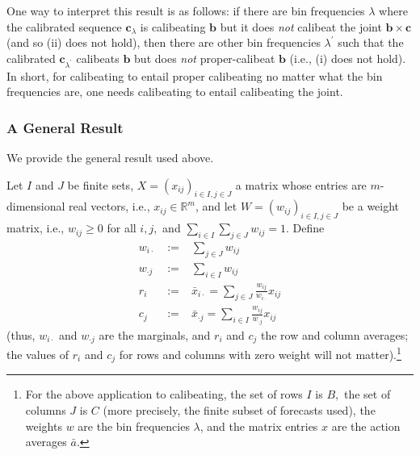 \documentclass[12pt,a4paper,notitlepage]{article}
\begin{document}
\bigskip

One way to interpret this result is as follows: if there are bin frequencies 
$\lambda $ where the calibrated sequence $\mathbf{c}_{\lambda }$ is
calibeating $\mathbf{b}$ but it does \emph{not} calibeat the joint $\mathbf{b%
}\times \mathbf{c}$ (and so (ii) does not hold), then there are other bin
frequencies $\lambda ^{\prime }$ such that the calibrated $\mathbf{c}%
_{\lambda ^{\prime }}$ calibeats $\mathbf{b}$ but does \emph{not}
proper-calibeat $\mathbf{b}$ (i.e., (i) does not hold). In short, for
calibeating to entail proper calibeating no matter what the bin frequencies
are, one needs calibeating to entail calibeating the joint.

\subsubsection{A General Result\label{susus-a:bxc general}}

We provide the general result used above.

Let $I$ and $J$ be finite sets, $X=(x_{ij})_{i\in I,j\in J}$ a matrix whose
entries are $m$-dimensional real vectors, i.e., $x_{ij}\in \mathbb{R}^{m}$,
and let $W=(w_{ij})_{i\in I,j\in J}$ be a weight matrix, i.e., $w_{ij}\geq 0$
for all $i,j,$ and $\sum_{i\in I}\sum_{j\in J}w_{ij}=1$. Define%
\begin{eqnarray*}
w_{i\cdot } &%
{\;:=\;}%
&\sum_{j\in J}w_{ij} \\
w_{\cdot j} &%
{\;:=\;}%
&\sum_{i\in I}w_{ij} \\
r_{i} &%
{\;:=\;}%
&\bar{x}_{i\cdot }=\sum_{j\in J}\frac{w_{ij}}{w_{i\cdot }}x_{ij} \\
c_{j} &%
{\;:=\;}%
&\bar{x}_{\cdot j}=\sum_{i\in I}\frac{w_{ij}}{w_{\cdot j}}x_{ij}
\end{eqnarray*}%
(thus, $w_{i\cdot }$ and $w_{\cdot j}$ are the marginals, and $r_{i}$ and $%
c_{j}$ the row and column averages; the values of $r_{i}$ and $c_{j}$ for
rows and columns with zero weight will not matter).\footnote{%
For the above application to calibeating, the set of rows $I$ is $B,$ the
set of columns $J$ is $C$ (more precisely, the finite subset of forecasts
used), the weights $w$ are the bin frequencies $\lambda $, and the matrix
entries $x$ are the action averages $\bar{a}$.}
\end{document}
